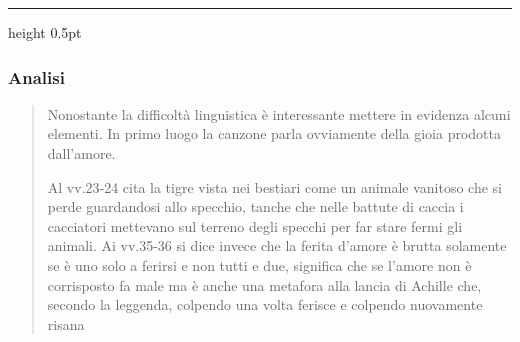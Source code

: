 \vspace{0.5em}
{\color{Tomato!40}\hrule height 0.5pt}
\vspace{1em}

\subsubsection*{Analisi}
\begin{quote}
\small 
Nonostante la difficoltà linguistica è interessante mettere in evidenza alcuni elementi. In primo luogo la canzone parla ovviamente della gioia prodotta dall'amore.

Al vv.23-24 cita la tigre vista nei bestiari come un animale vanitoso che si perde guardandosi allo specchio, tanche che nelle battute di caccia i cacciatori mettevano sul terreno degli specchi per far stare fermi gli animali.
Ai vv.35-36 si dice invece che la ferita d'amore è brutta solamente se è uno solo a ferirsi e non tutti e due, significa che se l'amore non è corrisposto fa male ma è anche una metafora alla lancia di Achille che, secondo la leggenda, colpendo una volta ferisce e colpendo nuovamente risana
\end{quote}